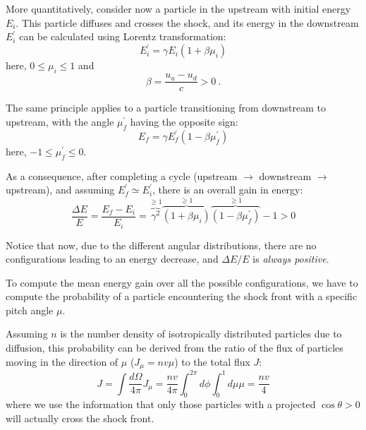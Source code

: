 More quantitatively, consider now a particle in the upstream with initial energy \( E_i \). 
%
This particle diffuses and crosses the shock, and its energy in the downstream \( E_i^\prime \) can be calculated using Lorentz transformation:
%
\begin{equation}
E_i^\prime = \gamma E_i \left( 1 + \beta \mu_i \right)
\end{equation}
%
here, \( 0 \le \mu_i \le 1 \) and
%
\begin{equation}
\beta = \frac{u_u - u_d}{c} > 0~.
\end{equation}

The same principle applies to a particle transitioning from downstream to upstream, with the angle \( \mu_f^\prime \) having the opposite sign:
%
\begin{equation}
E_f = \gamma E^\prime_f (1 - \beta \mu_f^\prime)
\end{equation}
here, \( -1 \le \mu_f^\prime \le 0 \).

As a consequence, after completing a cycle (upstream $\rightarrow$ downstream $\rightarrow$ upstream), and assuming \( E^\prime_f \simeq E^\prime_i \), there is an overall gain in energy:
%
\begin{equation}
\frac{\Delta E}{E} = \frac{E_f - E_i}{E_i} = \overbrace{\gamma^2}^{\ge 1} \overbrace{(1 + \beta \mu_i)}^{\ge 1} \overbrace{(1 - \beta \mu_f^\prime)}^{\ge 1} - 1 > 0
\end{equation}

Notice that now, due to the different angular distributions, there are no configurations leading to an energy decrease, and \( \Delta E / E \) is \emph{always positive}.

To compute the mean energy gain over all the possible configurations, we have to compute the probability of a particle encountering the shock front with a specific pitch angle \( \mu \). 

Assuming \( n \) is the number density of isotropically distributed particles due to diffusion, this probability can be derived from the ratio of the flux of particles moving in the direction of \( \mu \) (\( J_\mu = n v \mu \)) to the total flux \( J \):
%
\begin{equation}
J = \int \frac{d\Omega}{4\pi} J_\mu = \frac{n v}{4\pi} \int_0^{2\pi} d\phi \int_0^1 d\mu \mu = \frac{n v}{4}
\end{equation}
%
where we use the information that only those particles with a projected \( \cos \theta > 0 \) will actually cross the shock front.

